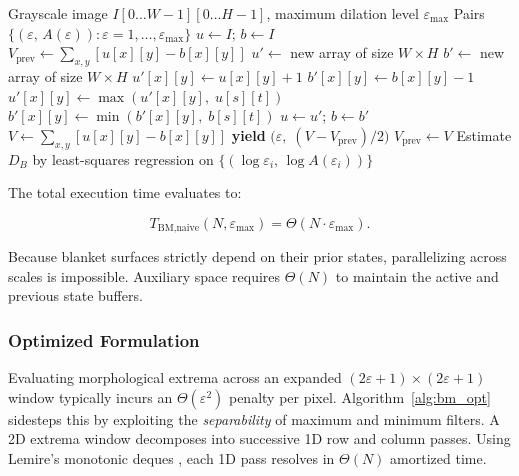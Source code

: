\begin{algorithm}[t]
\caption{Naive Blanket Method}
\label{alg:bm_naive}
\begin{algorithmic}[1]
\Require Grayscale image $I[0\ldots W{-}1][0\ldots H{-}1]$, maximum dilation level $\varepsilon_{\max}$
\Ensure Pairs $\{(\varepsilon,\, A(\varepsilon)) : \varepsilon = 1,\ldots,\varepsilon_{\max}\}$
\State $u \leftarrow I$;\; $b \leftarrow I$ \hfill{}
\State $V_{\text{prev}} \leftarrow \sum_{x,y} [u[x][y] - b[x][y]]$
  \State $u' \leftarrow$ new array of size $W \times H$
  \State $b' \leftarrow$ new array of size $W \times H$
      \State $u'[x][y] \leftarrow u[x][y] + 1$
      \State $b'[x][y] \leftarrow b[x][y] - 1$
        \State $u'[x][y] \leftarrow \max(u'[x][y],\; u[s][t])$
        \State $b'[x][y] \leftarrow \min(b'[x][y],\; b[s][t])$
      \EndFor
    \EndFor
  \EndFor
  \State $u \leftarrow u'$;\; $b \leftarrow b'$
  \State $V \leftarrow \sum_{x,y}[u[x][y]-b[x][y]]$
  \State \textbf{yield} $\bigl(\varepsilon,\;(V - V_{\text{prev}})/2\bigr)$
  \State $V_{\text{prev}} \leftarrow V$
\EndFor
\State Estimate $D_B$ by least-squares regression on $\{(\log \varepsilon_i,\, \log A(\varepsilon_i))\}$
\end{algorithmic}
\end{algorithm}

The total execution time evaluates to:

\begin{equation}
  T_{\text{BM,naive}}(N, \varepsilon_{\max}) = \Theta(N \cdot \varepsilon_{\max}).
  \label{eq:bm_naive_total}
\end{equation}

Because blanket surfaces strictly depend on their prior states, parallelizing across scales is impossible. Auxiliary space requires $\Theta(N)$ to maintain the active and previous state buffers.

\subsubsection{Optimized Formulation}

Evaluating morphological extrema across an expanded $(2\varepsilon+1) \times (2\varepsilon+1)$ window typically incurs an $\Theta(\varepsilon^2)$ penalty per pixel. Algorithm~\ref{alg:bm_opt} sidesteps this by exploiting the \textit{separability} of maximum and minimum filters. A 2D extrema window decomposes into successive 1D row and column passes. Using Lemire's monotonic deques \cite{Lemire2006}, each 1D pass resolves in $\Theta(N)$ amortized time.

